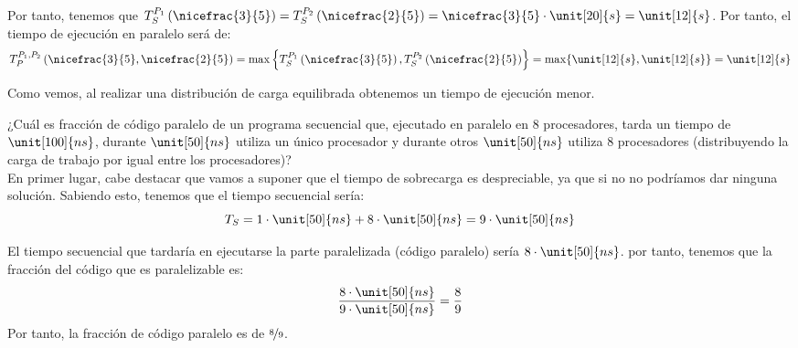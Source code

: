 \begin{ejercicio}
\begin{enumerate}
        Por tanto, tenemos que $T_S^{P_1}\left(\nicefrac{3}{5}\right) = T_S^{P_2}\left(\nicefrac{2}{5}\right) = \nicefrac{3}{5}\cdot \unit[20]{s} = \unit[12]{s}$. 
        Por tanto, el tiempo de ejecución en paralelo será de:
        \begin{equation*}
            T_P^{P_1, P_2}\left(\nicefrac{3}{5}, \nicefrac{2}{5}\right) = \max\left\{T_S^{P_1}\left(\nicefrac{3}{5}\right), T_S^{P_2}\left(\nicefrac{2}{5}\right)\right\} = \max\{\unit[12]{s}, \unit[12]{s}\} = \unit[12]{s}
        \end{equation*}

        Como vemos, al realizar una distribución de carga equilibrada obtenemos un tiempo de ejecución menor.
    \end{enumerate}

    

\end{ejercicio}

\begin{ejercicio}
    ¿Cuál es fracción de código paralelo de un programa secuencial que, ejecutado en paralelo en 8
    procesadores, tarda un tiempo de $\unit[100]{ns}$, durante $\unit[50]{ns}$ utiliza un único procesador y durante otros $\unit[50]{ns}$
    utiliza 8 procesadores (distribuyendo la carga de trabajo por igual entre los procesadores)?\\

    En primer lugar, cabe destacar que vamos a suponer que el tiempo de sobrecarga es despreciable, ya que si no no podríamos dar ninguna solución.
    Sabiendo esto, tenemos que el tiempo secuencial sería:
    \begin{equation*}
        T_S = 1\cdot \unit[50]{ns} + 8\cdot \unit[50]{ns} = 9\cdot \unit[50]{ns} 
    \end{equation*}

    El tiempo secuencial que tardaría en ejecutarse la parte paralelizada (código paralelo)
    sería $8\cdot \unit[50]{ns}$. por tanto, tenemos que la fracción del código que es paralelizable es:
    \begin{equation*}
        \frac{8\cdot \unit[50]{ns}}{9\cdot \unit[50]{ns}} = \frac{8}{9}
    \end{equation*}
    Por tanto, la fracción de código paralelo es de $\nicefrac{8}{9}$.
\end{ejercicio}

